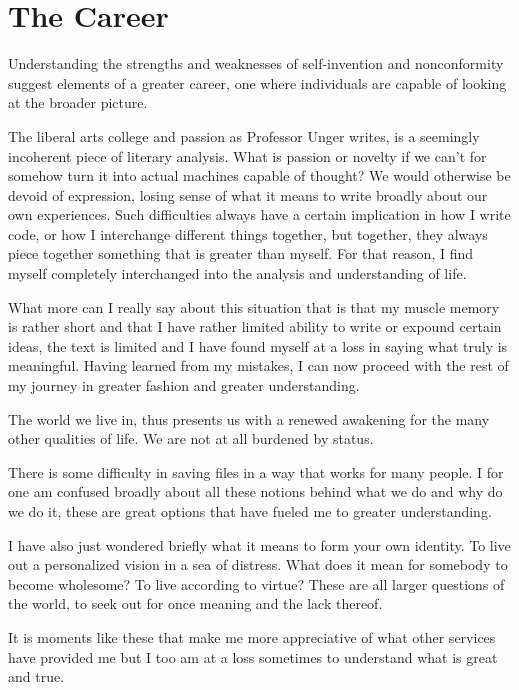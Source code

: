 \documentclass[12pt,letterpaper]{article}
\begin{document}
\section{The Career}
Understanding the strengths and weaknesses of self-invention and nonconformity suggest elements of a greater career, one where individuals are capable of looking at the broader picture.


The liberal arts college and passion as Professor Unger
writes, is a seemingly incoherent piece of literary
analysis.  What is passion or novelty if we can't for
somehow turn it into actual machines capable of thought?  We
would otherwise be devoid of expression, losing sense of
what it means to write broadly about our own experiences.
Such difficulties always have a certain implication in how
I write code, or how I interchange different things
together, but together, they always piece together
something that is greater than myself.  For that reason, I
find myself completely interchanged into the analysis and
understanding of life.

What more can I really say about this situation that is
that my muscle memory is rather short and that I have
rather limited ability to write or expound certain ideas,
the text is limited and I have found myself at a loss in
saying what truly is meaningful.  Having learned from my
mistakes, I can now proceed with the rest of my journey in
greater fashion and greater understanding.

The world we live in, thus presents us with a renewed
awakening for the many other qualities of life.  We are not
at all burdened by status.

There is some difficulty in saving files in a way that works for many people.  I for one am confused broadly about all these notions behind what we do and why do we do it, these are great options that have fueled me to greater understanding.

I have also just wondered briefly what it means to form your own identity.  To live out a personalized vision in a sea of distress.  What does it mean for somebody to become wholesome?  To live according to virtue?  These are all larger questions of the world, to seek out for once meaning and the lack thereof.

It is moments like these that make me more appreciative of what other services have provided me but I too am at a loss sometimes to understand what is great and true.

\fi
\end{document}
